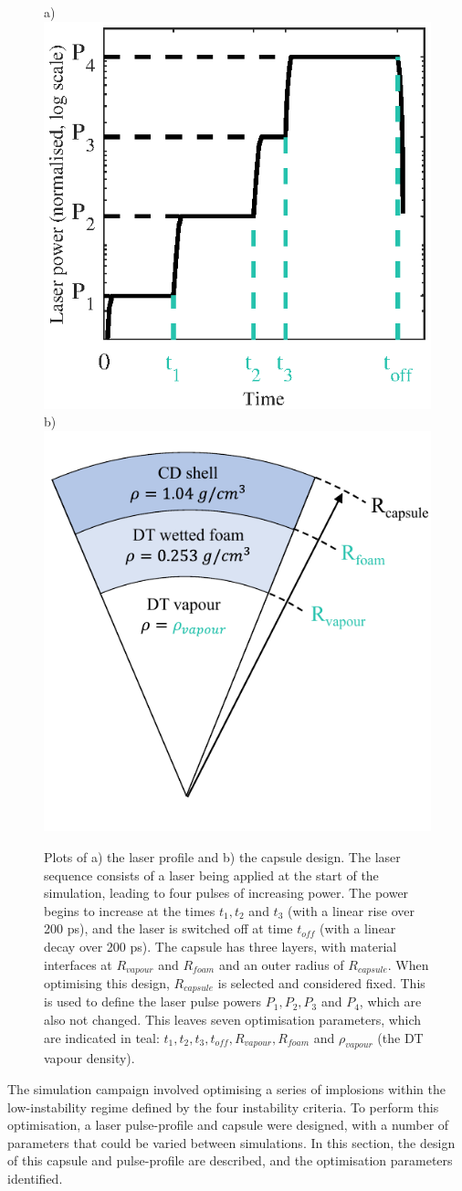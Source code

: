 \begin{figure} 
\centering     %
\subfigure a)\includegraphics[width=.45\textwidth]{figures/LowCR/LaserProfile_half.eps}
\subfigure b)\includegraphics[width=.45\textwidth]{figures/LowCR/Capsule.pdf}
\caption{\label{fig:CapsuleAndLaserProfile}Plots of a) the laser profile and b) the capsule design. The laser sequence consists of a laser being applied at the start of the simulation, leading to four pulses of increasing power. The power begins to increase at the times $t_1, t_2$ and $t_3$ (with a linear rise over 200 \unit{\pico\second}), and the laser is switched off at time $t_{off}$ (with a linear decay over 200 \unit{\pico\second}). The capsule has three layers, with material interfaces at  $R_{vapour}$ and $R_{foam}$ and an outer radius of $R_{capsule}$. When optimising this design, $R_{capsule}$ is selected and considered fixed. This is used to define the laser pulse powers $P_1, P_2, P_3$ and $P_4$, which are also not changed. This leaves seven optimisation parameters, which are indicated in teal: $t_1, t_2, t_3, t_{off}, R_{vapour}, R_{foam}$ and $\rho_{vapour}$ (the DT vapour density).}
\end{figure}

The simulation campaign involved optimising a series of implosions within the low-instability regime defined by the four instability criteria. To perform this optimisation, a laser pulse-profile and capsule were designed, with a number of parameters that could be varied between simulations. In this section, the design of this capsule and pulse-profile are described, and the optimisation parameters identified.

